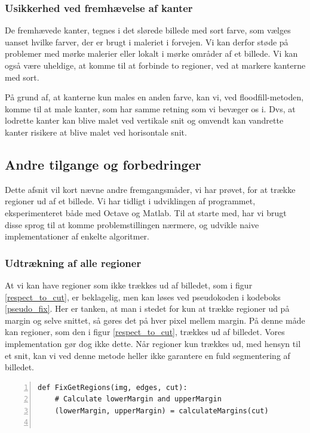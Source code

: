 {\subsubsection{Usikkerhed ved fremhævelse af kanter}
De fremhævede kanter, tegnes i det slørede billede med sort farve, som
vælges uanset hvilke farver, der er brugt i maleriet i forvejen. Vi kan
derfor støde på problemer med mørke malerier eller lokalt i mørke
områder af et billede. Vi kan også være uheldige, at komme til at
forbinde to regioner, ved at markere kanterne med sort.

På grund af, at kanterne kun males en anden farve, kan vi, ved
floodfill-metoden, komme til at male kanter, som har samme retning som
vi bevæger os i. Dvs, at lodrette kanter kan blive malet ved vertikale
snit og omvendt kan vandrette kanter risikere at blive malet ved
horisontale snit.

\subsection{Andre tilgange og forbedringer}
Dette afsnit vil kort nævne andre fremgangsmåder, vi har prøvet, for at
trække regioner ud af et billede. Vi har tidligt i udviklingen af
programmet, eksperimenteret både med Octave og Matlab. Til at starte
med, har vi brugt disse sprog til at komme problemstillingen nærmere,
og udvikle naive implementationer af enkelte algoritmer.

\subsubsection{Udtrækning af alle regioner}
At vi kan have regioner som ikke trækkes ud af billedet, som i figur
\ref{respect_to_cut}, er beklagelig, men kan løses ved pseudokoden i
kodeboks \ref{pseudo_fix}.  Her er tanken, at man i stedet for kun at
trække regioner ud på margin og selve snittet, så gøres det på hver
pixel mellem margin. På denne måde kan regioner, som den i figur
\ref{respect_to_cut}, trækkes ud af billedet. Vores implementation gør
dog ikke dette. Når regioner kun trækkes ud, med hensyn til et snit, kan
vi ved denne metode heller ikke garantere en fuld segmentering af
billedet.

\begin{lstlisting}[caption={Pseudokode til udtrækning af regioner med
    margin.},captionpos=b,label={pseudo_fix},numbers=left,
    frame=tb, breaklines=false, float=h]
def FixGetRegions(img, edges, cut):
    # Calculate lowerMargin and upperMargin
    (lowerMargin, upperMargin) = calculateMargins(cut)


\end{lstlisting}}
